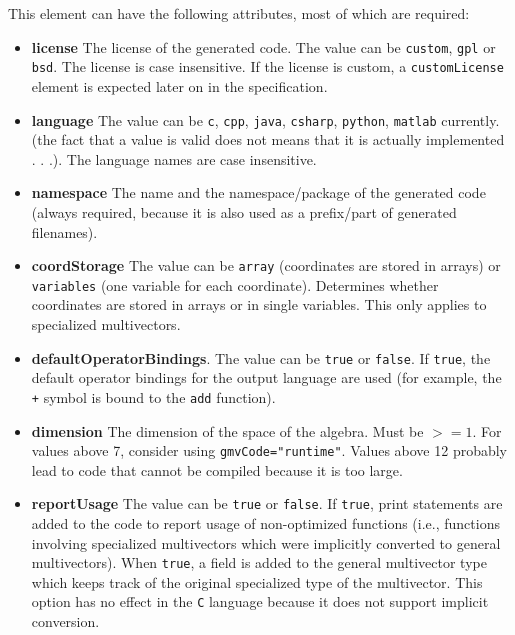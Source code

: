 \documentclass[10pt, a4paper]{article}
\begin{document}
This element can have the following attributes, most of which are required:
\begin{itemize}
\item {\bf license} The license of the generated code. The value can be {\tt custom}, {\tt gpl} or {\tt bsd}. The license is case insensitive.
If the license is custom, a {\tt customLicense} element is expected later on in the specification.

\item {\bf language} The value can be {\tt c}, {\tt cpp}, {\tt java}, {\tt csharp}, {\tt python}, {\tt matlab} currently. 
(the fact that a value is valid does not means that it is actually implemented . . .). The language names are case insensitive.

\item {\bf namespace} The name and the namespace/package of the generated code (always required, because it is also used as a prefix/part of generated filenames).

\item {\bf coordStorage} The value can be {\tt array} (coordinates are stored in arrays) or {\tt variables} (one variable for each coordinate). 
Determines whether coordinates are stored in arrays or in single variables. This only applies to specialized multivectors. 

\item {\bf defaultOperatorBindings}. The value can be {\tt true} or {\tt false}. If {\tt true}, the default operator bindings for the output language are used 
(for example, the {\tt +} symbol is bound to the {\tt add} function).

\item {\bf dimension} The dimension of the space of the algebra. Must be $>= 1$. 
For values above 7, consider using {\tt gmvCode="runtime"}.
Values above 12 probably lead to code that cannot be compiled because it is too large.

\item {\bf reportUsage} The value can be {\tt true} or {\tt false}. If {\tt true}, print statements are added to the code to report usage of non-optimized functions
       (i.e., functions involving specialized multivectors which were implicitly converted to general multivectors). 
       When {\tt true}, a field is added to the general multivector type which keeps track of the original specialized 
       type of the multivector. This option has no effect in the {\tt C} language because it does not support implicit conversion.
 

\end{itemize}
\end{document}
